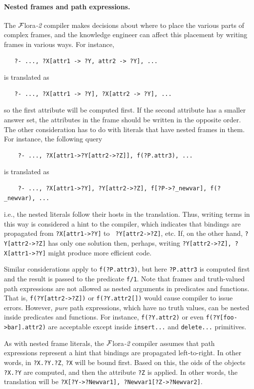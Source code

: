 \documentclass[11pt]{article}
\newcommand{\FLORA}{{\mbox{\sc ${\cal F}${lora}\rm\emph{-2}}}\xspace}
\newcommand{\FLSYSTEM}{\FLORA}
\begin{document}
\paragraph{Nested frames and path expressions.}
The \FLSYSTEM compiler makes decisions about
where to place the various parts of complex frames, and the
knowledge engineer can affect this placement by writing frames in various ways.
For instance,
\begin{verbatim}
   ?- ..., ?X[attr1 -> ?Y, attr2 -> ?Y], ...
\end{verbatim}
is translated as
\begin{verbatim}
   ?- ..., ?X[attr1 -> ?Y], ?X[attr2 -> ?Y], ...  
\end{verbatim}
so the first attribute will be computed first. If the second attribute has
a smaller answer set, the attributes in the frame should be written in
the opposite order. The other consideration has to do with literals that
have nested frames in them. For instance, the following query
\begin{verbatim}
    ?- ..., ?X[attr1->?Y[attr2->?Z]], f(?P.attr3), ...
\end{verbatim}
is translated as
\begin{verbatim}
    ?- ..., ?X[attr1->?Y], ?Y[attr2->?Z], f[?P->?_newvar], f(?_newvar), ...
\end{verbatim}
i.e., the nested literals follow their hosts in the translation.
Thus, writing terms in this way is considered a hint to the compiler, which
indicates that bindings are propagated from {\tt ?X[attr1->?Y]} to {\tt
  ?Y[attr2->?Z]}, etc. If, on the other hand, {\tt ?Y[attr2->?Z]} has only one
solution then, perhaps, writing {\tt ?Y[attr2->?Z], ?X[attr1->?Y]} might
produce more efficient code.

Similar considerations apply to {\tt f(?P.attr3)}, but here
\texttt{?P.attr3} is computed first and the result is passed to the
predicate \texttt{f/1}.   
Note that frames and
truth-valued path expressions are not allowed as nested arguments
in predicates and functions. That is, \texttt{f(?Y[attr2->?Z])} or
\texttt{f(?Y.attr2[])} would cause compiler to issue errors. However,
\emph{pure} path expressions, which have no truth values, can be nested
inside predicates and functions. For instance, \texttt{f(?Y.attr2)} or 
even \texttt{f(?Y[foo->bar].attr2)} are acceptable except inside
\texttt{insert{...}}  and \texttt{delete{...}} primitives. 

As with nested frame literals, the \FLSYSTEM compiler assumes that path
expressions represent a hint that bindings are propagated left-to-right.
In other words, in {\tt ?X.?Y.?Z}, {\tt ?X} will be bound first.
Based on this, the oids of the objects {\tt ?X.?Y} are computed, and
then the attribute {\tt ?Z} is applied. In other words, the translation will
be {\tt ?X[?Y->?Newvar1], ?Newvar1[?Z->?Newvar2]}.
\end{document}
